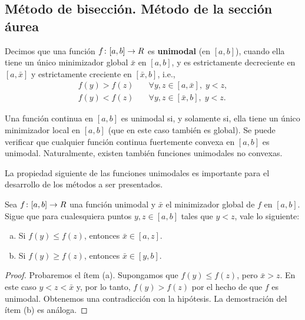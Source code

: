 \subsection{Método de bisección. Método de la sección áurea}

\begin{definition}\label{v2:def:2.3.1}
    Decimos que una función $f \colon [a, b] \to R$ es \textbf{unimodal} (en $[a, b]$), cuando ella tiene un único minimizador global $\bar{x}$ en $[a, b]$, y es estrictamente decreciente en $[a, \bar{x}]$ y estrictamente creciente en $[\bar{x}, b]$, i.e.,
    \begin{align*}
        f(y) > f(z) \quad &\forall y, z \in [a, \bar{x}], \; y < z, \\
        f(y) < f(z) \quad &\forall y, z \in [\bar{x}, b], \; y < z.
    \end{align*}
\end{definition}

Una función continua en $[a, b]$ es unimodal si, y solamente si, ella tiene un único minimizador local en $[a, b]$ (que en este caso también es global). Se puede verificar que cualquier función continua fuertemente convexa en $[a, b]$ es unimodal. Naturalmente, existen también funciones unimodales no convexas.

La propiedad siguiente de las funciones unimodales es importante para el desarrollo de los métodos a ser presentados.

\begin{lemma}\label{v2:lem:2.3.1}
    Sea $f \colon [a, b] \to R$ una función unimodal y $\bar{x}$ el minimizador global de $f$ en $[a, b]$.
    Sigue que para cualesquiera puntos $y, z \in [a, b]$ tales que $y < z$, vale lo siguiente:
    \begin{enumerate}[(a)]
        \item Si $f(y) \le f(z)$, entonces $\bar{x} \in [a, z]$.
        \item Si $f(y) \ge f(z)$, entonces $\bar{x} \in [y, b]$.
    \end{enumerate}
\end{lemma}

\begin{proof}
    Probaremos el ítem (a). Supongamos que $f(y) \le f(z)$, pero $\bar{x} > z$. En este caso $y < z < \bar{x}$ y, por lo tanto, $f(y) > f(z)$ por el hecho de que $f$ es unimodal. Obtenemos una contradicción con la hipótesis. 
    La demostración del ítem (b) es análoga.
\end{proof}

